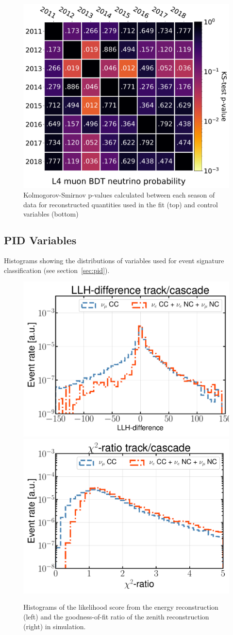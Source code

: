 \begin{figure}
\begin{center}
      \includegraphics[width=0.3 \linewidth]{figures/icecube/selection/data_stability/KS_tests/ks_map_L4_MuonClassifier_Data_ProbNu_final_level_binning.pdf}
  \end{center}
  \caption{Kolmogorov-Smirnov p-values calculated between each season of data for reconstructed quantities used in the fit (top) and control variables (bottom)}
  \label{fig:data_stability_2D_control_KS}
\end{figure}


\subsection{PID Variables}
\label{sec:apx-pidvars}
Histograms showing the distributions of variables used for event signature classification (see section~\ref{sec:pid}).

\begin{figure}
    \centering
    \includegraphics[width=0.49\linewidth]{figures/icecube/classification/variables/leera.pdf}
    \includegraphics[width=0.49\linewidth]{figures/icecube/classification/variables/santa.pdf}
    \caption{Histograms of the likelihood score from the energy reconstruction (left) and the goodness-of-fit ratio of the zenith reconstruction (right) in simulation.}
    \label{fig:apx-pidvars-santa-leera}
\end{figure}


